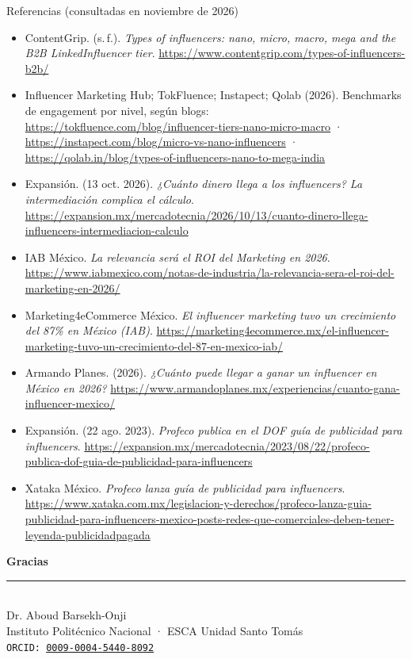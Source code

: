 \documentclass[aspectratio=169,xcolor=dvipsnames]{beamer}
\begin{document}
\begin{frame}[allowframebreaks]{Referencias (consultadas en noviembre de 2026)}
\tiny
\begin{itemize}
  \item[] ContentGrip. (s.\,f.). \textit{Types of influencers: nano, micro, macro, mega and the B2B LinkedInfluencer tier}. \url{https://www.contentgrip.com/types-of-influencers-b2b/}
  \item[] Influencer Marketing Hub; TokFluence; Instapect; Qolab (2026). Benchmarks de engagement por nivel, según blogs: \url{https://tokfluence.com/blog/influencer-tiers-nano-micro-macro} · \url{https://instapect.com/blog/micro-vs-nano-influencers} · \url{https://qolab.in/blog/types-of-influencers-nano-to-mega-india}
  \item[] Expansión. (13 oct. 2026). \textit{¿Cuánto dinero llega a los influencers? La intermediación complica el cálculo}. \url{https://expansion.mx/mercadotecnia/2026/10/13/cuanto-dinero-llega-influencers-intermediacion-calculo}
  \item[] IAB México. \textit{La relevancia será el ROI del Marketing en 2026}. \url{https://www.iabmexico.com/notas-de-industria/la-relevancia-sera-el-roi-del-marketing-en-2026/}
  \item[] Marketing4eCommerce México. \textit{El influencer marketing tuvo un crecimiento del 87\% en México (IAB)}. \url{https://marketing4ecommerce.mx/el-influencer-marketing-tuvo-un-crecimiento-del-87-en-mexico-iab/}
  \item[] Armando Planes. (2026). \textit{¿Cuánto puede llegar a ganar un influencer en México en 2026?} \url{https://www.armandoplanes.mx/experiencias/cuanto-gana-influencer-mexico/}
  \item[] Expansión. (22 ago. 2023). \textit{Profeco publica en el DOF guía de publicidad para influencers}. \url{https://expansion.mx/mercadotecnia/2023/08/22/profeco-publica-dof-guia-de-publicidad-para-influencers}
  \item[] Xataka México. \textit{Profeco lanza guía de publicidad para influencers}. \url{https://www.xataka.com.mx/legislacion-y-derechos/profeco-lanza-guia-publicidad-para-influencers-mexico-posts-redes-que-comerciales-deben-tener-leyenda-publicidadpagada}
\end{itemize}
\end{frame}

\begin{frame}
    \begin{center}
        {\Large \textcolor{IPNguinda}{\textbf{Gracias}}}\\[6pt]
        {\color{IPNdorado}\rule{0.4\linewidth}{1.2pt}}\\[6pt]
        Dr. Aboud Barsekh-Onji \\
        \small Instituto Politécnico Nacional · ESCA Unidad Santo Tomás \\
        \small \texttt{ORCID: \href{https://orcid.org/0009-0004-5440-8092}{0009-0004-5440-8092}}
    \end{center}
\end{frame}
\end{document}
